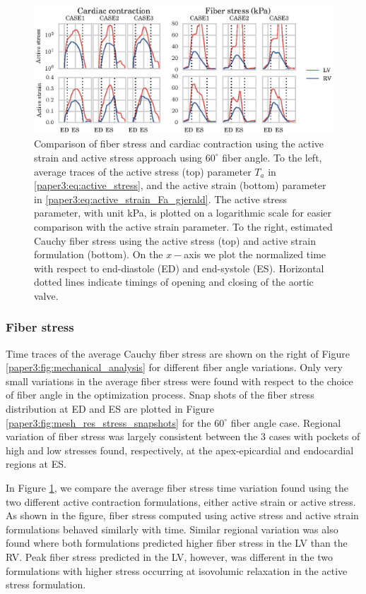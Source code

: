 \begin{figure}[htbp]
  \centering
  \includegraphics{figures/mechanics_mesh_conv}
  \caption{\label{paper3:fig:active_stress_conv}Comparison of fiber stress
    and cardiac contraction using the active strain and active stress
    approach using $60^{\circ}$ fiber angle.
    To the left, average traces of the active stress (top) parameter $T_a$
    in \eqref{paper3:eq:active_stress}, and the active strain (bottom)
    parameter in \ref{paper3:eq:active_strain_Fa_gjerald}.  The active
    stress parameter, with unit kPa, is plotted on a logarithmic scale
    for easier comparison with the active strain parameter.
    To the right, estimated
    Cauchy fiber stress using the active
    stress (top) and active strain formulation (bottom).  On the $x-$axis we
    plot the normalized time with respect to end-diastole (ED) and
    end-systole (ES). Horizontal dotted lines indicate timings of
    opening and closing of the aortic valve.}
\end{figure}


\subsubsection{Fiber stress}
Time traces of the average Cauchy fiber stress are shown on the right
of Figure \ref{paper3:fig:mechanical_analysis} for different fiber angle
variations.  Only very small variations in the average fiber stress
were found with respect to the choice of fiber angle in the
optimization process. Snap shots of the fiber stress distribution at
ED and ES are plotted in Figure \ref{paper3:fig:mesh_res_stress_snapshots}
for the  $60^{\circ}$ fiber angle case. Regional variation of fiber
stress was largely consistent between the 3 cases with pockets of high
and low stresses found, respectively, at the apex-epicardial and
endocardial regions at ES.

In Figure \ref{paper3:fig:active_stress_conv}, we compare the average fiber stress
time variation found using the two different active contraction
formulations, either active strain or active stress. As shown in the figure, fiber stress computed using
active stress and active strain formulations behaved similarly with
time. Similar regional variation was also found where both
formulations predicted higher fiber stress in the LV than 
the RV. Peak fiber stress predicted in the LV, however, was different in
the two formulations with higher stress occurring at isovolumic
relaxation in the active stress formulation. 

